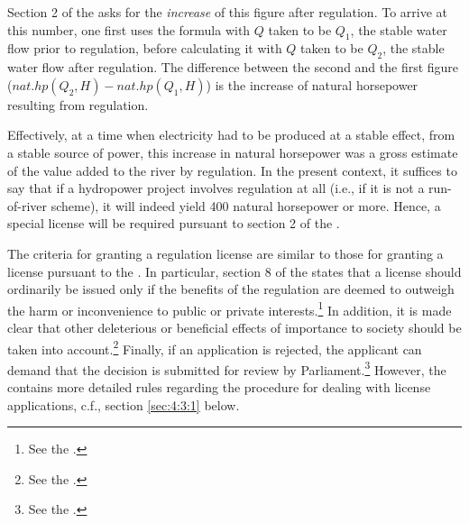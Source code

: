 Section 2 of the \cite{wra17} asks for the {\it increase} of this figure after regulation. To arrive at this number, one first uses the formula with $Q$ taken to be $Q_1$, the stable water flow prior to regulation, before calculating it with $Q$ taken to be $Q_2$, the stable water flow after regulation. The difference between the second and the first figure ($nat.hp(Q_2,H) - nat.hp(Q_1,H)$) is the increase of natural horsepower resulting from regulation.

Effectively, at a time when electricity had to be produced at a stable effect, from a stable source of power, this increase in natural horsepower was a gross estimate of the value added to the river by regulation. In the present context, it suffices to say that if a hydropower project involves regulation at all (i.e., if it is not a run-of-river scheme), it will indeed yield 400 natural horsepower or more. Hence, a special license will be required pursuant to section 2 of the \cite{wra17}. 

The criteria for granting a regulation license are similar to those for granting a license pursuant to the \cite{wra00}. In particular, section 8 of the \cite{wra17} states that a license should ordinarily be issued only if the benefits of the regulation are deemed to outweigh the harm or inconvenience to public or private interests.\footnote{See the \dni\cite[8]{wra17}.} In addition, it is made clear that other deleterious or beneficial effects of importance to society should be taken into account.\footnote{See the \dni\cite[8]{wra17}.} Finally, if an application is rejected, the applicant can demand that the decision is submitted for review by Parliament.\footnote{See the \dni\cite[8]{wra17}.} However, the \cite{wra17} contains more detailed rules regarding the procedure for dealing with license applications, c.f., section \ref{sec:4:3:1} below. 

